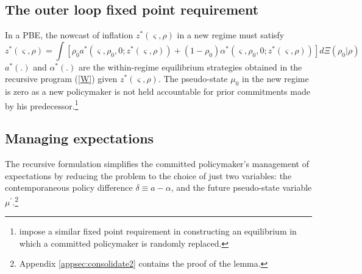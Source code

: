 \documentclass[12pt,letter,leqno]{article}
\theoremstyle{asn}
\theoremstyle{lem}
\theoremstyle{slem}
\theoremstyle{prop}
\theoremstyle{appprop}
\theoremstyle{rem}
\theoremstyle{defn}
\begin{document}
\subsection{The outer loop fixed point requirement}\label{sec:z}

In a PBE, the nowcast of inflation $z^*(\varsigma ,\rho )$ in a new regime must satisfy
\begin{equation}
z^*(\varsigma ,\rho) =\int [\rho _{0}a^*( \varsigma ,\rho
_{0},0;z^*(\varsigma ,\rho)) +( 1-\rho _{0}) \alpha ^*( \varsigma
,\rho _{0},0;z^*(\varsigma ,\rho))]d\Xi(\rho_0|\rho)
\label{z}
\end{equation}%
$a^{\ast }(.)$ and $\alpha ^{\ast }(.)$ are the within-regime equilibrium strategies obtained in the recursive program (\ref{W}) given $z^{\ast
}(\varsigma ,\rho )$. The pseudo-state $\mu_0$ in the new regime is zero as a new policymaker is not held accountable for prior commitments made by his predecessor.\footnote{\cite{schaumburg_investigation_2007} impose a similar fixed point requirement in constructing an equilibrium in which a committed policymaker is randomly replaced.}


\subsection{Managing expectations}
The recursive formulation simplifies the committed policymaker’s management of expectations by reducing the problem to the choice of just two variables: the contemporaneous policy difference $\delta \equiv a-\alpha $, and the future pseudo-state
variable $\mu ^{\prime }$.\footnote{Appendix \ref{appsec:consolidate2} contains the proof of the lemma.}
\end{document}
